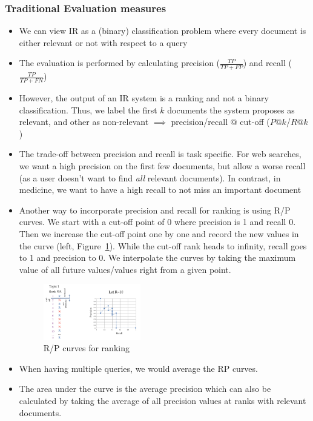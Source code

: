 \subsubsection{Traditional Evaluation measures}
\begin{itemize}
	\item We can view IR as a (binary) classification problem where every document is either relevant or not with respect to a query
	\item The evaluation is performed by calculating precision ($\frac{TP}{TP+FP}$) and recall ($\frac{TP}{TP+FN}$)
	\item However, the output of an IR system is a ranking and not a binary classification. Thus, we label the first $k$ documents the system proposes as relevant, and other as non-relevant $\implies$ precision/recall $@$ cut-off ($P@k$/$R@k$)
	\item The trade-off between precision and recall is task specific. For web searches, we want a high precision on the first few documents, but allow a worse recall (as a user doesn't want to find \textit{all} relevant documents). In contrast, in medicine, we want to have a high recall to not miss an important document
	\item Another way to incorporate precision and recall for ranking is using R/P curves. We start with a cut-off point of 0 where precision is 1 and recall 0. Then we increase the cut-off point one by one and record the new values in the curve (left, Figure~\ref{img:offline_eval_RP_curves}). While the cut-off rank heads to infinity, recall goes to 1 and precision to 0. We interpolate the curves by taking the maximum value of all future values/values right from a given point.
	\begin{figure}[ht]
		\centering
		\includegraphics[width=0.4\textwidth]{figures/offline_eval_RP_curves.png}
		\caption{R/P curves for ranking}
		\label{img:offline_eval_RP_curves}
	\end{figure}
	\item When having multiple queries, we would average the RP curves. 
	\item The area under the curve is the average precision which can also be calculated by taking the average of all precision values at ranks with relevant documents.

\end{itemize}
